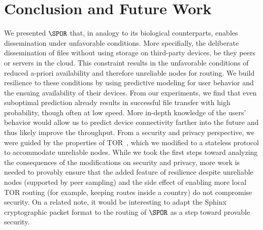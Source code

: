 \section{Conclusion and Future Work}%
\label{conclusion}

We presented \(\SPOR\) that, in analogy to its biological
counterparts, enables dissemination under unfavorable conditions. More
specifially, the deliberate dissemination of files without using
storage on third-party devices, be they peers or servers in the
cloud. This constraint results in the unfavorable conditions of
reduced a-priori availability and therefore unreliable nodes for
routing. We build resilience to these conditions by using predictive
modeling for user behavior and the ensuing availability of their
devices. From our experiments, we find that even suboptimal prediction
already results in successful file transfer with high probability,
though often at low speed. More in-depth knowledge of the users'
behavior would allow us to predict device connectivity farther into
the future and thus likely improve the throughput. From a security and
privacy perspective, we were guided by the properties of
TOR~\cite{Tor}, which we modified to a stateless protocol to
accommodate unreliable nodes. While we took the first steps toward
analyzing the consequences of the modifications on security and
privacy, more work is needed to provably ensure that the added feature
of resilience despite unreliable nodes (supported by peer sampling)
and the side effect of enabling more local TOR routing (for example,
keeping routes inside a country) do not compromise security. On a
related note, it would be interesting to adapt the
Sphinx~\cite{Sphinx} cryptographic packet format to the routing of
\(\SPOR\) as a step toward provable security.

